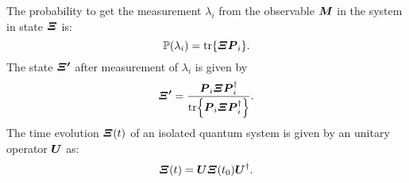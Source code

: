         The probability to get the measurement $\lambda_i$ from the observable 
        $\bm{\relax{M}}$ in the system in state $\bm{\relax{\varXi}}$ is:
        \begin{equation}
            \mathbb{P}(\lambda_i)=\tr{\bm{\relax{\varXi}}\bm{\relax{P}}_i}.
            \label{post:3.1}
        \end{equation}
        The state $\bm{\relax{\varXi'}}$ after measurement of $\lambda_i$ is given by
        \begin{equation}
            \bm{\relax{\varXi'}}=\frac{\bm{\relax{P}}_i\bm{\relax{\varXi}}\bm{\relax{P}}_i^\dagger}
            {\tr{\bm{\relax{P}}_i\bm{\relax{\varXi}}\bm{\relax{P}}_i^\dagger}}.
            \label{post:4.1}
        \end{equation}
        The time evolution $\bm{\relax{\varXi}}(t)$ of an isolated quantum system is given by an unitary operator
        $\bm{\relax{U}}$ as:
        \begin{equation}
            \bm{\relax{\varXi}}(t)=\bm{\relax{U}}\bm{\relax{\varXi}}(t_0)\bm{\relax{U}}^\dagger.
            \label{post:5.1}
        \end{equation}